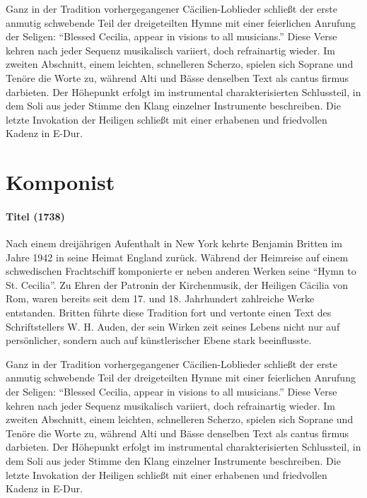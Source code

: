 \documentclass[11pt, ngermanm, titlepage]{article}
\begin{document}
\begin{multicols}{2}
	Ganz in der Tradition vorhergegangener Cäcilien-Loblieder schließt der erste anmutig schwebende Teil der dreigeteilten Hymne mit einer feierlichen Anrufung der Seligen: "`Blessed Cecilia, appear in visions to all musicians."' Diese Verse kehren nach jeder Sequenz musikalisch variiert, doch refrainartig wieder. Im zweiten Abschnitt, einem leichten, schnelleren Scherzo, spielen sich Soprane und Tenöre die Worte zu, während Alti und Bässe denselben Text als cantus firmus darbieten. Der Höhepunkt erfolgt im instrumental charakterisierten Schlussteil, in dem Soli aus jeder Stimme den Klang einzelner Instrumente beschreiben. Die letzte Invokation der Heiligen schließt mit einer erhabenen und friedvollen Kadenz in E-Dur. 
	
	\section*{Komponist}
	\paragraph{Titel (1738)\newline}
	Nach einem dreijährigen Aufenthalt in New York kehrte Benjamin Britten im Jahre 1942 in seine Heimat England zurück. Während der Heimreise auf einem schwedischen Frachtschiff komponierte er neben anderen Werken seine "`Hymn to St. Cecilia"'. Zu Ehren der Patronin der Kirchenmusik, der Heiligen Cäcilia von Rom, waren bereits seit dem 17. und 18. Jahrhundert zahlreiche Werke entstanden. Britten führte diese Tradition fort und vertonte einen Text des Schriftstellers W. H. Auden, der sein Wirken zeit seines Lebens nicht nur auf persönlicher, sondern auch auf künstlerischer Ebene stark beeinflusste. 
	
	Ganz in der Tradition vorhergegangener Cäcilien-Loblieder schließt der erste anmutig schwebende Teil der dreigeteilten Hymne mit einer feierlichen Anrufung der Seligen: "`Blessed Cecilia, appear in visions to all musicians."' Diese Verse kehren nach jeder Sequenz musikalisch variiert, doch refrainartig wieder. Im zweiten Abschnitt, einem leichten, schnelleren Scherzo, spielen sich Soprane und Tenöre die Worte zu, während Alti und Bässe denselben Text als cantus firmus darbieten. Der Höhepunkt erfolgt im instrumental charakterisierten Schlussteil, in dem Soli aus jeder Stimme den Klang einzelner Instrumente beschreiben. Die letzte Invokation der Heiligen schließt mit einer erhabenen und friedvollen Kadenz in E-Dur. 
	\end{multicols}
\end{document}
